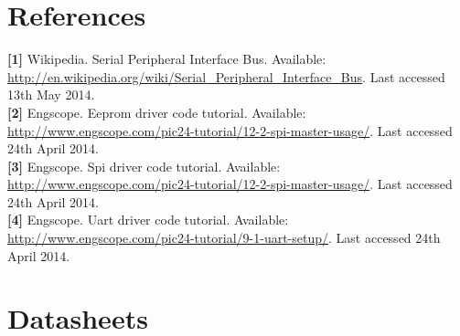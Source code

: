 
\raggedbottom


\pagestyle{empty}

\pagestyle{IHA}

\tableofcontents





\chapter{References}
\textbf{[1]} Wikipedia. Serial Peripheral Interface Bus. Available: \url{http://en.wikipedia.org/wiki/Serial\_Peripheral\_Interface\_Bus}. Last accessed 13th May 2014.\\
\textbf{[2]} Engscope. Eeprom driver code tutorial. Available: \url{http://www.engscope.com/pic24-tutorial/12-2-spi-master-usage/}. Last accessed 24th April 2014.\\
\textbf{[3]} Engscope. Spi driver code tutorial. Available: \url{http://www.engscope.com/pic24-tutorial/12-2-spi-master-usage/}. Last accessed 24th April 2014.\\
\textbf{[4]} Engscope. Uart driver code tutorial. Available: \url{http://www.engscope.com/pic24-tutorial/9-1-uart-setup/}. Last accessed 24th April 2014.\\

\chapter{Datasheets}


\listoffixmes
